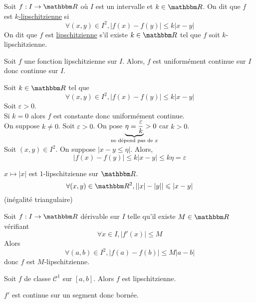 \begin{defn}
	Soit $f: I \to \R$ où $I$ est un intervalle et $k \in \R$. On dit que $f$ est \underline{$k$-lipschitzienne} si \[
		\forall (x,y) \in I^2, \left| f(x) - f(y) \right| \le k\left| x-y \right| 
	\] 
	On dit que $f$ est \underline{lipschitzienne} s'il existe $k\in \R$ tel que $f$ soit $k$-lipschitzienne.
\end{defn}

\begin{prop}
	Soit $f$ une fonction lipschitzienne sur $I$. Alors, $f$ est uniformément continue sur $I$ donc continue sur $I$.
\end{prop}

\begin{prv}
	Soit $k \in \R$ tel que \[
		\forall (x,y) \in I^2, \left| f(x) - f(y) \right| \le k\left| x-y \right| 
	\] Soit $\varepsilon>0$.\\
	Si $k = 0$ alors $f$ est constante donc uniformément continue.\\
	On suppose $k \neq 0$. Soit $\varepsilon>0$. On pose $\underbrace{\eta = \frac{\varepsilon}{k}}_{\mathclap{\text{ne dépend pas de } x}} >0$ car $k > 0$.\\
	Soit $(x,y) \in I^2$. On suppose $\left| x-y \le \eta \right|$. Alors, \[
		\left| f(x)-f(y) \right| \le k\left| x-y \right| \le k\eta = \varepsilon
	\]
\end{prv}

\begin{exm}
	$x \mapsto \left| x \right|$ est $1$-lipschitzienne sur $\R$. \[
		\forall (x,y) \in \R^2,
		\left| \left| x \right| - \left| y \right|  \right| \le \left| x - y \right| 
	\] (inégalité triangulaire)
\end{exm}

\begin{thm}
	Soit $f: I \to \R$ dérivable sur $I$ telle qu'il existe $M \in \R$ vérifiant \[
		\forall x \in I, \left| f'(x) \right| \le M
	\] Alors \[
		\forall (a,b) \in I^2, \left| f(a) - f(b) \right| \le M\left| a-b \right| 
	\] donc $f$ est $M$-lipschitzienne.
\end{thm}

\begin{crlr}
	Soit $f$ de classe $\mathcal{C}^1$ sur $[a,b]$. Alors $f$ est lipschitzienne.
\end{crlr}

\begin{prv}
	$f'$ est continue sur un segment donc bornée.
\end{prv}

